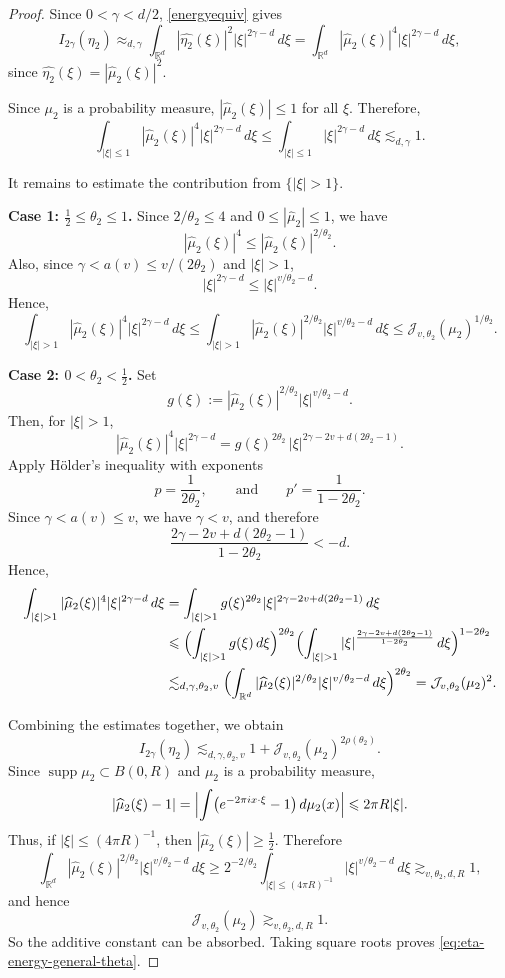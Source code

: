 \documentclass[11pt]{amsart}
\numberwithin{equation}{section}
\renewcommand{\ge}{\geqslant}
\renewcommand{\le}{\leqslant}
\newcommand{\J}{\mathcal{J}}
\theoremstyle{plain}
\theoremstyle{remark}
\newcommand{\Rd}{\mathbb{R}^d}
\newcommand{\supp}{\operatorname{supp}}
\newcommand{\cJ}{\mathcal{J}}
\begin{document}
\begin{proof}
Since $0<\gamma<d/2$, \eqref{energyequiv} gives
\[
I_{2\gamma}(\eta_2)
\approx_{d,\gamma}
\int_{\Rd}|\widehat{\eta_2}(\xi)|^2|\xi|^{2\gamma-d}\,d\xi
=
\int_{\Rd}|\widehat\mu_2(\xi)|^4|\xi|^{2\gamma-d}\,d\xi,
\]
since $\widehat{\eta_2}(\xi)=|\widehat\mu_2(\xi)|^2$.

Since $\mu_2$ is a probability measure, $|\widehat\mu_2(\xi)|\le 1$ for all $\xi$.
Therefore,
\[
\int_{|\xi|\le 1}|\widehat\mu_2(\xi)|^4|\xi|^{2\gamma-d}\,d\xi
\le
\int_{|\xi|\le 1}|\xi|^{2\gamma-d}\,d\xi
\lesssim_{d,\gamma}1.
\]

It remains to estimate the contribution from $\{|\xi|>1\}$.

\smallskip
\noindent
\textbf{Case 1: $\frac12\le \theta_2\le 1$.}
Since $2/\theta_2\le 4$ and $0\le |\widehat\mu_2|\le 1$, we have
\[
|\widehat\mu_2(\xi)|^4\le |\widehat\mu_2(\xi)|^{2/\theta_2}.
\]
Also, since $\gamma<a(v)\le v/(2\theta_2)$ and $|\xi|>1$,
\[
|\xi|^{2\gamma-d}\le |\xi|^{v/\theta_2-d}.
\]
Hence,
\[
\int_{|\xi|>1}|\widehat\mu_2(\xi)|^4|\xi|^{2\gamma-d}\,d\xi
\le
\int_{|\xi|>1}|\widehat\mu_2(\xi)|^{2/\theta_2}|\xi|^{v/\theta_2-d}\,d\xi
\le
\J_{v,\theta_2}(\mu_2)^{1/\theta_2}.
\]

\smallskip
\noindent
\textbf{Case 2: $0<\theta_2<\frac12$.}
Set
\[
g(\xi):=
|\widehat\mu_2(\xi)|^{2/\theta_2}|\xi|^{v/\theta_2-d}.
\]
Then, for $|\xi|>1$,
\[
|\widehat\mu_2(\xi)|^4|\xi|^{2\gamma-d}
=
g(\xi)^{2\theta_2}\,|\xi|^{2\gamma-2v+d(2\theta_2-1)}.
\]
Apply H\"older's inequality with exponents
\[
p=\frac{1}{2\theta_2},
\qquad \text{and} \qquad 
p'=\frac{1}{1-2\theta_2}.
\]
Since $\gamma<a(v)\le v$, we have $\gamma<v$, and therefore
\[
\frac{2\gamma-2v+d(2\theta_2-1)}{1-2\theta_2}<-d.
\]
Hence,
\begin{align*}
\int_{|\xi|>1}|\widehat\mu_2(\xi)|^4|\xi|^{2\gamma-d}\,d\xi
&=
\int_{|\xi|>1}g(\xi)^{2\theta_2}|\xi|^{2\gamma-2v+d(2\theta_2-1)}\,d\xi\\
&\le
\Bigl(\int_{|\xi|>1}g(\xi)\,d\xi\Bigr)^{2\theta_2}
\Bigl(
\int_{|\xi|>1}
|\xi|^{\frac{2\gamma-2v+d(2\theta_2-1)}{1-2\theta_2}}\,d\xi
\Bigr)^{1-2\theta_2}\\
&\lesssim_{d,\gamma,\theta_2,v}
\Bigl(
\int_{\Rd}
|\widehat\mu_2(\xi)|^{2/\theta_2}|\xi|^{v/\theta_2-d}\,d\xi
\Bigr)^{2\theta_2}
=
\J_{v,\theta_2}(\mu_2)^2.
\end{align*}

Combining the estimates together, we obtain
\[
I_{2\gamma}(\eta_2)
\lesssim_{d,\gamma,\theta_2,v}
1+\J_{v,\theta_2}(\mu_2)^{2\rho(\theta_2)}.
\]
Since $\supp\mu_2\subset B(0,R)$ and $\mu_2$ is a probability measure,
\[
|\widehat\mu_2(\xi)-1|
=
\Bigl|
\int \bigl(e^{-2\pi i x\cdot \xi}-1\bigr)\,d\mu_2(x)
\Bigr|
\le
2\pi R|\xi|.
\]
Thus, if $|\xi|\le (4\pi R)^{-1}$, then $|\widehat\mu_2(\xi)|\ge \frac12$. Therefore
\[
\int_{\Rd}
|\widehat\mu_2(\xi)|^{2/\theta_2}|\xi|^{v/\theta_2-d}\,d\xi
\ge
2^{-2/\theta_2}\int_{|\xi|\le (4\pi R)^{-1}} |\xi|^{v/\theta_2-d}\,d\xi
\gtrsim_{v,\theta_2,d,R} 1,
\]
and hence
\[
\cJ_{v,\theta_2}(\mu_2)\gtrsim_{v,\theta_2,d,R} 1.
\]
So the additive constant can be absorbed. Taking square roots proves
\eqref{eq:eta-energy-general-theta}.
\end{proof}
\end{document}
